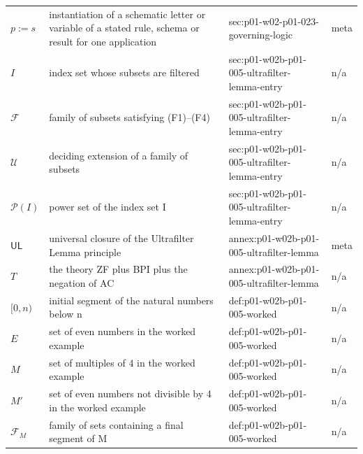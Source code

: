 \begin{longtable}{@{}p{}p{}p{}p{}@{}}
\(p:=s\) & instantiation of a schematic letter or variable of a stated rule, schema or result for one application & sec:\allowbreak{}p01-\allowbreak{}w02-\allowbreak{}p01-\allowbreak{}023-\allowbreak{}governing-\allowbreak{}logic & meta \\
\(I\) & index set whose subsets are filtered & sec:\allowbreak{}p01-\allowbreak{}w02b-\allowbreak{}p01-\allowbreak{}005-\allowbreak{}ultrafilter-\allowbreak{}lemma-\allowbreak{}entry & n/a \\
\(\mathcal F\) & family of subsets satisfying (F1)--(F4) & sec:\allowbreak{}p01-\allowbreak{}w02b-\allowbreak{}p01-\allowbreak{}005-\allowbreak{}ultrafilter-\allowbreak{}lemma-\allowbreak{}entry & n/a \\
\(\mathcal U\) & deciding extension of a family of subsets & sec:\allowbreak{}p01-\allowbreak{}w02b-\allowbreak{}p01-\allowbreak{}005-\allowbreak{}ultrafilter-\allowbreak{}lemma-\allowbreak{}entry & n/a \\
\(\mathcal P(I)\) & power set of the index set I & sec:\allowbreak{}p01-\allowbreak{}w02b-\allowbreak{}p01-\allowbreak{}005-\allowbreak{}ultrafilter-\allowbreak{}lemma-\allowbreak{}entry & n/a \\
\(\mathsf{UL}\) & universal closure of the Ultrafilter Lemma principle & annex:\allowbreak{}p01-\allowbreak{}w02b-\allowbreak{}p01-\allowbreak{}005-\allowbreak{}ultrafilter-\allowbreak{}lemma & meta \\
\(T\) & the theory ZF plus BPI plus the negation of AC & annex:\allowbreak{}p01-\allowbreak{}w02b-\allowbreak{}p01-\allowbreak{}005-\allowbreak{}ultrafilter-\allowbreak{}lemma & n/a \\
\([0,\allowbreak n)\) & initial segment of the natural numbers below n & def:\allowbreak{}p01-\allowbreak{}w02b-\allowbreak{}p01-\allowbreak{}005-\allowbreak{}worked & n/a \\
\(E\) & set of even numbers in the worked example & def:\allowbreak{}p01-\allowbreak{}w02b-\allowbreak{}p01-\allowbreak{}005-\allowbreak{}worked & n/a \\
\(M\) & set of multiples of 4 in the worked example & def:\allowbreak{}p01-\allowbreak{}w02b-\allowbreak{}p01-\allowbreak{}005-\allowbreak{}worked & n/a \\
\(M'\) & set of even numbers not divisible by 4 in the worked example & def:\allowbreak{}p01-\allowbreak{}w02b-\allowbreak{}p01-\allowbreak{}005-\allowbreak{}worked & n/a \\
\(\mathcal F_M\) & family of sets containing a final segment of M & def:\allowbreak{}p01-\allowbreak{}w02b-\allowbreak{}p01-\allowbreak{}005-\allowbreak{}worked & n/a \\

\end{longtable}
